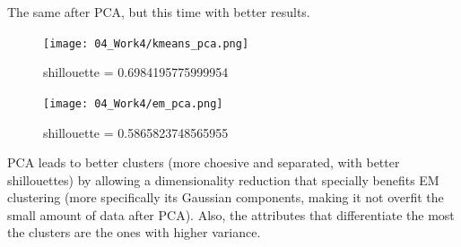 \documentclass{article}
\begin{document}
\clearpage
The same after PCA, but this time with better results.
\begin{figure}[h!]
    \centering
    \texttt{[image: 04\_Work4/kmeans\_pca.png]}
    \caption{shillouette = 0.6984195775999954}
\end{figure}
\begin{figure}[h!]
    \centering
    \texttt{[image: 04\_Work4/em\_pca.png]}
    \caption{shillouette = 0.5865823748565955}
\end{figure}

PCA leads to better clusters (more choesive and separated, with better shillouettes)
by allowing a dimensionality reduction that specially benefits EM clustering
(more specifically its Gaussian components, making it not overfit the small amount of data after PCA). Also, the attributes that differentiate the most the clusters are the ones with higher variance.
\end{document}
